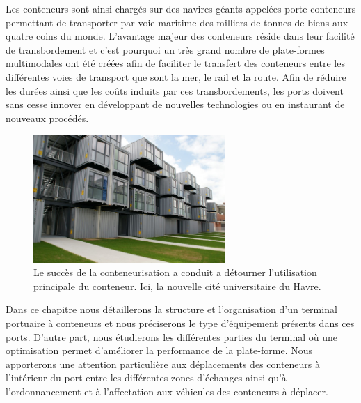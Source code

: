 Les conteneurs sont ainsi chargés sur des navires géants appelées porte-conteneurs permettant de transporter par voie maritime des milliers de tonnes de biens aux quatre coins du monde. L'avantage majeur des conteneurs réside dans leur facilité de transbordement et c'est pourquoi un très grand nombre de plate-formes multimodales ont été créées afin de faciliter le transfert des conteneurs entre les différentes voies de transport que sont la mer, le rail et la route. Afin de réduire les durées ainsi que les coûts induits par ces transbordements, les ports doivent sans cesse innover en développant de nouvelles technologies ou en instaurant de nouveaux procédés.\\

\begin{figure}
 \begin{center}
  \includegraphics[width=0.65\textwidth]{chapitres/application/citeUConteneurs.jpg}
  \caption{Le succès de la conteneurisation a conduit a détourner l'utilisation principale du conteneur. Ici, la nouvelle cité universitaire du Havre.}
 \end{center}
\end{figure}

Dans ce chapitre nous détaillerons la structure et l'organisation d'un terminal portuaire à conteneurs et nous préciserons le type d'équipement présents dans ces ports. D'autre part, nous étudierons les différentes parties du terminal où une optimisation permet d'améliorer la performance de la plate-forme. Nous apporterons une attention particulière aux déplacements des conteneurs à l'intérieur du port entre les différentes zones d'échanges ainsi qu'à l'ordonnancement et à l'affectation aux véhicules des conteneurs à déplacer.